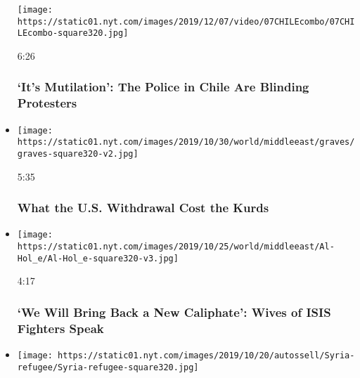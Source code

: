 \begin{itemize}
  \texttt{[image: https://static01.nyt.com/images/2019/12/07/video/07CHILEcombo/07CHILEcombo-square320.jpg]}

  6:26

  \hypertarget{its-mutilation-the-police-in-chile-are-blinding-protesters}{%
  \subsubsection{`It's Mutilation': The Police in Chile Are Blinding
  Protesters}\label{its-mutilation-the-police-in-chile-are-blinding-protesters}}
\item
  \href{https://www.nytimes.com/video/world/middleeast/100000006789926/us-kurds.html?action=click\&module=video-series-bar\&region=header\&pgtype=Article\&playlistId=video/on-the-ground}{}

  \texttt{[image: https://static01.nyt.com/images/2019/10/30/world/middleeast/graves/graves-square320-v2.jpg]}

  5:35

  \hypertarget{what-the-us-withdrawal-cost-the-kurds}{%
  \subsubsection{What the U.S. Withdrawal Cost the
  Kurds}\label{what-the-us-withdrawal-cost-the-kurds}}
\item
  \href{https://www.nytimes.com/video/world/middleeast/100000006777985/syria-isis-alhol-turkey-kurds.html?action=click\&module=video-series-bar\&region=header\&pgtype=Article\&playlistId=video/on-the-ground}{}

  \texttt{[image: https://static01.nyt.com/images/2019/10/25/world/middleeast/Al-Hol\_e/Al-Hol\_e-square320-v3.jpg]}

  4:17

  \hypertarget{we-will-bring-back-a-new-caliphate-wives-of-isis-fighters-speak}{%
  \subsubsection{`We Will Bring Back a New Caliphate': Wives of ISIS
  Fighters
  Speak}\label{we-will-bring-back-a-new-caliphate-wives-of-isis-fighters-speak}}
\item
  \href{https://www.nytimes.com/video/world/middleeast/100000006757197/turkey-syria-invasion.html?action=click\&module=video-series-bar\&region=header\&pgtype=Article\&playlistId=video/on-the-ground}{}

  \texttt{[image: https://static01.nyt.com/images/2019/10/20/autossell/Syria-refugee/Syria-refugee-square320.jpg]}


\end{itemize}
